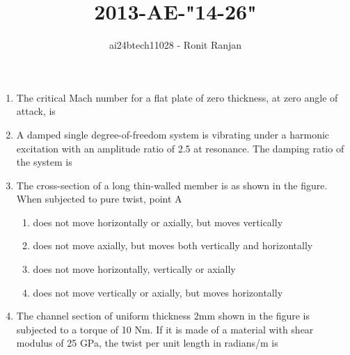 \documentclass[journal,12pt,onecolumn]{IEEEtran}
\theoremstyle{remark}
\begin{document}

\vspace{3cm}

\title{2013-AE-"14-26"}
\author{ai24btech11028 - Ronit Ranjan}
\maketitle
\bigskip


\begin{enumerate}
    \item The critical Mach number for a flat plate of zero thickness, at zero angle of attack, is \underline{\hspace{2cm}}

    \item A damped single degree-of-freedom system is vibrating under a harmonic excitation with an amplitude ratio of 2.5 at resonance. The damping ratio of the system is \underline{\hspace{2cm}}

    \item The cross-section of a long thin-walled member is as shown in the figure. When subjected to pure twist, point A 
    
    \begin{figure}[!ht]
    \centering
    \label{fig:my_label}
    \end{figure}
    \begin{enumerate}
        \item does not move horizontally or axially, but moves vertically 
        \item does not move axially, but moves both vertically and horizontally
        \item does not move horizontally, vertically or axially
        \item does not move vertically or axially, but moves horizontally
    \end{enumerate} 

    \item The channel section of uniform thickness 2mm shown in the figure is subjected to a torque of 10 Nm. If it is made of a material with shear modulus of 25 GPa, the twist per unit length in radians/m is \underline{\hspace{2cm}}
    \begin{figure}[!ht]
    \centering


\end{figure}
\end{enumerate}
\end{document}
